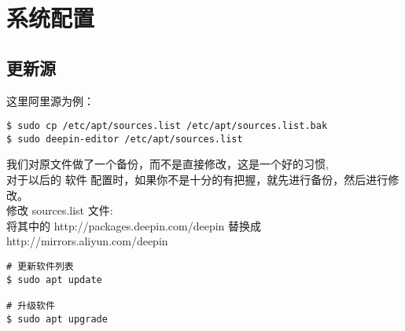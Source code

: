 \section{系统配置}
\subsection{更新源}
这里阿里源为例：
\begin{lstlisting}
$ sudo cp /etc/apt/sources.list /etc/apt/sources.list.bak  
$ sudo deepin-editor /etc/apt/sources.list
\end{lstlisting}

我们对原文件做了一个备份，而不是直接修改，这是一个好的习惯,\\
对于以后的 软件 配置时，如果你不是十分的有把握，就先进行备份，然后进行修改。\\


修改 sources.list 文件: \\
将其中的 http://packages.deepin.com/deepin 替换成 http://mirrors.aliyun.com/deepin \\

\begin{lstlisting}
# 更新软件列表
$ sudo apt update  

# 升级软件 
$ sudo apt upgrade 
\end{lstlisting}